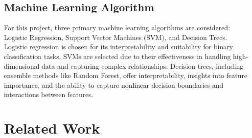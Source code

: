 \documentclass[11pt]{article}
\begin{document}
\subsection{Machine Learning Algorithm}
\text For this project, three primary machine learning algorithms are considered: Logistic Regression, Support Vector Machines (SVM), and Decision Trees. Logistic regression is chosen for its interpretability and suitability for binary classification tasks. SVMs are selected due to their effectiveness in handling high-dimensional data and capturing complex relationships. Decision trees, including ensemble methods like Random Forest, offer interpretability, insights into feature importance, and the ability to capture nonlinear decision boundaries and interactions between features.
\section{Related Work}
\text 
\end{document}
